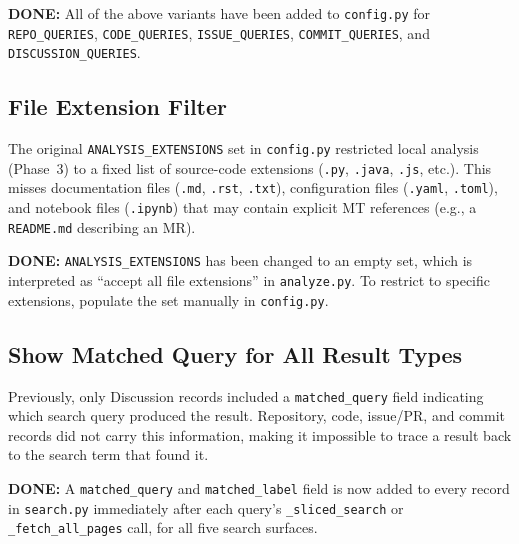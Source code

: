 \documentclass[12pt,a4paper]{article}
\newenvironment{done}{\begin{mdframed}[linecolor=donecolor,linewidth=1pt]\textbf{\color{donecolor}DONE: }}{\end{mdframed}}
\begin{document}
\begin{done}
All of the above variants have been added to \texttt{config.py} for
\texttt{REPO\_QUERIES}, \texttt{CODE\_QUERIES}, \texttt{ISSUE\_QUERIES},
\texttt{COMMIT\_QUERIES}, and \texttt{DISCUSSION\_QUERIES}.
\end{done}

\subsection{File Extension Filter}

The original \texttt{ANALYSIS\_EXTENSIONS} set in \texttt{config.py} restricted
local analysis (Phase~3) to a fixed list of source-code extensions
(\texttt{.py}, \texttt{.java}, \texttt{.js}, etc.). This misses documentation
files (\texttt{.md}, \texttt{.rst}, \texttt{.txt}), configuration files
(\texttt{.yaml}, \texttt{.toml}), and notebook files (\texttt{.ipynb}) that may
contain explicit MT references (e.g., a \texttt{README.md} describing an MR).

\begin{done}
\texttt{ANALYSIS\_EXTENSIONS} has been changed to an empty set, which is
interpreted as ``accept all file extensions'' in \texttt{analyze.py}. To
restrict to specific extensions, populate the set manually in
\texttt{config.py}.
\end{done}

\subsection{Show Matched Query for All Result Types}

Previously, only Discussion records included a \texttt{matched\_query} field
indicating which search query produced the result. Repository, code, issue/PR,
and commit records did not carry this information, making it impossible to
trace a result back to the search term that found it.

\begin{done}
A \texttt{matched\_query} and \texttt{matched\_label} field is now added to
every record in \texttt{search.py} immediately after each query's
\texttt{\_sliced\_search} or \texttt{\_fetch\_all\_pages} call, for all five
search surfaces.
\end{done}
\end{document}
